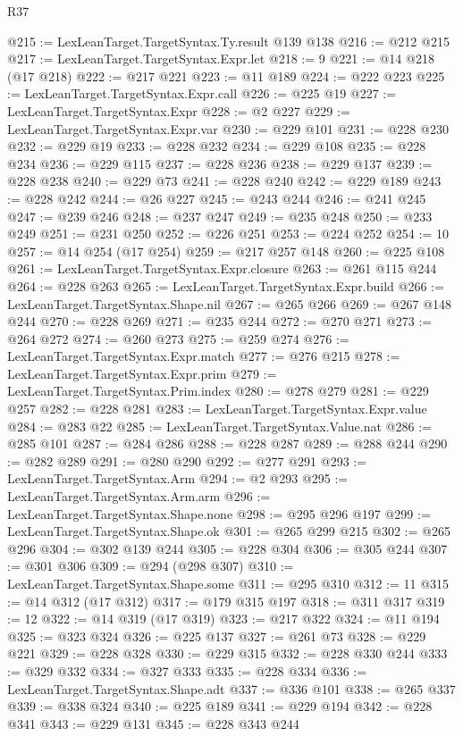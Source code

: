 \begin{lexlean}{R37}
\begin{coremodule}
@215 := LexLeanTarget.TargetSyntax.Ty.result @139 @138
@216 := @212 @215
@217 := LexLeanTarget.TargetSyntax.Expr.let
@218 := 9
@221 := @14 @218 (@17 @218)
@222 := @217 @221
@223 := @11 @189
@224 := @222 @223
@225 := LexLeanTarget.TargetSyntax.Expr.call
@226 := @225 @19
@227 := LexLeanTarget.TargetSyntax.Expr
@228 := @2 @227
@229 := LexLeanTarget.TargetSyntax.Expr.var
@230 := @229 @101
@231 := @228 @230
@232 := @229 @19
@233 := @228 @232
@234 := @229 @108
@235 := @228 @234
@236 := @229 @115
@237 := @228 @236
@238 := @229 @137
@239 := @228 @238
@240 := @229 @73
@241 := @228 @240
@242 := @229 @189
@243 := @228 @242
@244 := @26 @227
@245 := @243 @244
@246 := @241 @245
@247 := @239 @246
@248 := @237 @247
@249 := @235 @248
@250 := @233 @249
@251 := @231 @250
@252 := @226 @251
@253 := @224 @252
@254 := 10
@257 := @14 @254 (@17 @254)
@259 := @217 @257 @148
@260 := @225 @108
@261 := LexLeanTarget.TargetSyntax.Expr.closure
@263 := @261 @115 @244
@264 := @228 @263
@265 := LexLeanTarget.TargetSyntax.Expr.build
@266 := LexLeanTarget.TargetSyntax.Shape.nil
@267 := @265 @266
@269 := @267 @148 @244
@270 := @228 @269
@271 := @235 @244
@272 := @270 @271
@273 := @264 @272
@274 := @260 @273
@275 := @259 @274
@276 := LexLeanTarget.TargetSyntax.Expr.match
@277 := @276 @215
@278 := LexLeanTarget.TargetSyntax.Expr.prim
@279 := LexLeanTarget.TargetSyntax.Prim.index
@280 := @278 @279
@281 := @229 @257
@282 := @228 @281
@283 := LexLeanTarget.TargetSyntax.Expr.value
@284 := @283 @22
@285 := LexLeanTarget.TargetSyntax.Value.nat
@286 := @285 @101
@287 := @284 @286
@288 := @228 @287
@289 := @288 @244
@290 := @282 @289
@291 := @280 @290
@292 := @277 @291
@293 := LexLeanTarget.TargetSyntax.Arm
@294 := @2 @293
@295 := LexLeanTarget.TargetSyntax.Arm.arm
@296 := LexLeanTarget.TargetSyntax.Shape.none
@298 := @295 @296 @197
@299 := LexLeanTarget.TargetSyntax.Shape.ok
@301 := @265 @299 @215
@302 := @265 @296
@304 := @302 @139 @244
@305 := @228 @304
@306 := @305 @244
@307 := @301 @306
@309 := @294 (@298 @307)
@310 := LexLeanTarget.TargetSyntax.Shape.some
@311 := @295 @310
@312 := 11
@315 := @14 @312 (@17 @312)
@317 := @179 @315 @197
@318 := @311 @317
@319 := 12
@322 := @14 @319 (@17 @319)
@323 := @217 @322
@324 := @11 @194
@325 := @323 @324
@326 := @225 @137
@327 := @261 @73
@328 := @229 @221
@329 := @228 @328
@330 := @229 @315
@332 := @228 @330 @244
@333 := @329 @332
@334 := @327 @333
@335 := @228 @334
@336 := LexLeanTarget.TargetSyntax.Shape.adt
@337 := @336 @101
@338 := @265 @337
@339 := @338 @324
@340 := @225 @189
@341 := @229 @194
@342 := @228 @341
@343 := @229 @131
@345 := @228 @343 @244

\end{coremodule}
\end{lexlean}

